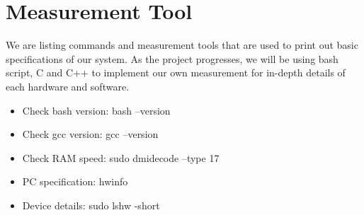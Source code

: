 \section{Measurement Tool}
\hspace{2em}We are listing commands and measurement tools that are used to print out basic specifications of our system. As the project progresses, we will be using bash script, C and C++ to implement our own measurement for in-depth details of each hardware and software.
\begin{itemize}
  \vspace{-0.2cm}\item Check bash version:		bash --version
  \vspace{-0.2cm}\item Check gcc version:		gcc --version
  \vspace{-0.2cm}\item Check RAM speed:		sudo dmidecode --type 17
  \vspace{-0.2cm}\item PC specification:		hwinfo
  \vspace{-0.2cm}\item Device details:			sudo lshw -short
\end{itemize}


